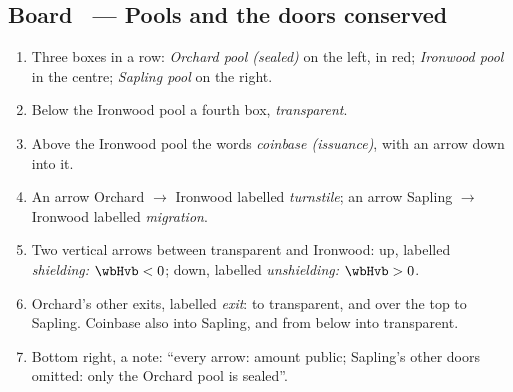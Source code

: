 \documentclass[11pt,a4paper]{article}
\makeatletter
\newcounter{board}
\newenvironment{board}[2]{\stepcounter{board}%
  \subsection*{Board \theboard\ --- #1 \hfill {\normalfont\small\color{arb}#2}}}{\medskip}
\newcommand{\Draw}{\draw@head{Draw}}
\makeatother
\begin{document}
\begin{board}{Pools and the doors}{conserved}
\Draw
\begin{enumerate}
  \item Three boxes in a row: \emph{Orchard pool (sealed)} on the left,
    in red; \emph{Ironwood pool} in the centre; \emph{Sapling pool} on
    the right.
  \item Below the Ironwood pool a fourth box, \emph{transparent}.
  \item Above the Ironwood pool the words \emph{coinbase (issuance)},
    with an arrow down into it.
  \item An arrow Orchard $\to$ Ironwood labelled \emph{turnstile}; an
    arrow Sapling $\to$ Ironwood labelled \emph{migration}.
  \item Two vertical arrows between transparent and Ironwood: up,
    labelled \emph{shielding: $\wbHvb < 0$}; down, labelled
    \emph{unshielding: $\wbHvb > 0$}.
  \item Orchard's other exits, labelled \emph{exit}: to transparent, and
    over the top to Sapling. Coinbase also into Sapling, and from below
    into transparent.
  \item Bottom right, a note: ``every arrow: amount public;
    Sapling's other doors omitted: only the Orchard pool is sealed''.
\end{enumerate}
\begin{center}
\end{center}
\end{board}
\end{document}
